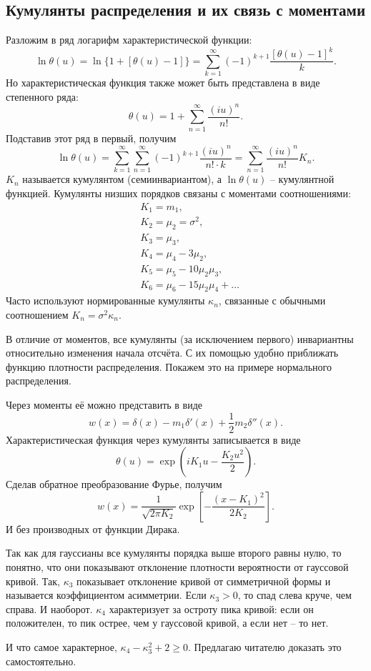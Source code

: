 \subsection{Кумулянты распределения и их связь с моментами}
Разложим в ряд логарифм характеристической функции:
\[
    \ln\theta(u) = \ln\{1 + [\theta(u) - 1]\} = \sum_{k=1}^\infty
    (-1)^{k+1}\frac{[\theta(u) - 1]^k}{k}.
\]
Но характеристическая функция также может быть представлена в виде степенного
ряда:
\[
    \theta(u) = 1 + \sum_{n=1}^\infty \frac{(iu)^n}{n!}.
\]
Подставив этот ряд в первый, получим
\[
    \ln\theta(u) = \sum_{k=1}^\infty \sum_{n=1}^\infty
    (-1)^{k+1}\frac{(iu)^n}{n! \cdot k} =
    \sum_{n=1}^\infty\frac{(iu)^n}{n!}K_n.
\]
\( K_n \) называется кумулянтом (семиинвариантом), а \( \ln\theta(u) \) --
кумулянтной функцией. Кумулянты низших порядков связаны с моментами
соотношениями:
\begin{align*}
    & K_1 = m_1, \\
    & K_2 = \mu_2 = \sigma^2, \\
    & K_3 = \mu_3, \\
    & K_4 = \mu_4 - 3\mu_2, \\
    & K_5 = \mu_5 - 10\mu_2\mu_3, \\
    & K_6 = \mu_6 - 15\mu_2\mu_4 + \ldots
\end{align*}
Часто используют нормированные кумулянты \( \kappa_n \), связанные с обычными
соотношением \( K_n = \sigma^2\kappa_n \).

В отличие от моментов, все кумулянты (за исключением первого) инвариантны
относительно изменения начала отсчёта. С их помощью удобно приближать функцию
плотности распределения. Покажем это на примере нормального распределения.

Через моменты её можно представить в виде
\[
    w(x) = \delta(x) - m_1\delta'(x) + \frac{1}{2}m_2\delta''(x).
\]
Характеристическая функция через кумулянты записывается в виде
\[
    \theta(u) = \exp\left( iK_1u - \frac{K_2u^2}{2} \right).
\]
Сделав обратное преобразование Фурье, получим
\[
    w(x) = \frac{1}{\sqrt{2\pi K_2}}\exp\left[ -\frac{(x-K_1)^2}{2K_2} \right].
\]
И без производных от функции Дирака.

Так как для гауссианы все кумулянты порядка выше второго равны нулю, то понятно,
что они показывают отклонение плотности вероятности от гауссовой кривой. Так,
\( \kappa_3 \) показывает отклонение кривой от симметричной формы и называется
коэффициентом асимметрии. Если \( \kappa_3 > 0  \), то спад слева круче, чем
справа. И наоборот. \( \kappa_4 \) характеризует за остроту пика кривой: если он
положителен, то пик острее, чем у гауссовой кривой, а если нет -- то нет.

И что самое характерное, \( \kappa_4 - \kappa_3^2 + 2 \ge 0 \). Предлагаю
читателю доказать это самостоятельно.

